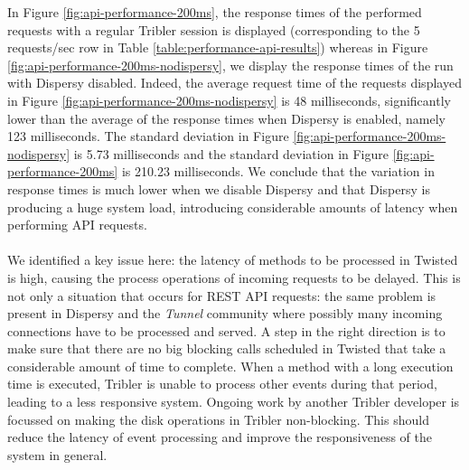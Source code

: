\noindent In Figure \ref{fig:api-performance-200ms}, the response times of the performed requests with a regular Tribler session is displayed (corresponding to the 5 requests/sec row in Table \ref{table:performance-api-results}) whereas in Figure \ref{fig:api-performance-200ms-nodispersy}, we display the response times of the run with Dispersy disabled. Indeed, the average request time of the requests displayed in Figure \ref{fig:api-performance-200ms-nodispersy} is 48 milliseconds, significantly lower than the average of the response times when Dispersy is enabled, namely 123 milliseconds. The standard deviation in Figure \ref{fig:api-performance-200ms-nodispersy} is 5.73 milliseconds and the standard deviation in Figure \ref{fig:api-performance-200ms} is 210.23 milliseconds. We conclude that the variation in response times is much lower when we disable Dispersy and that Dispersy is producing a huge system load, introducing considerable amounts of latency when performing API requests.\\\\
We identified a key issue here: the latency of methods to be processed in Twisted is high, causing the process operations of incoming requests to be delayed. This is not only a situation that occurs for REST API requests: the same problem is present in Dispersy and the \emph{Tunnel} community where possibly many incoming connections have to be processed and served. A step in the right direction is to make sure that there are no big blocking calls scheduled in Twisted that take a considerable amount of time to complete. When a method with a long execution time is executed, Tribler is unable to process other events during that period, leading to a less responsive system. Ongoing work by another Tribler developer is focussed on making the disk operations in Tribler non-blocking. This should reduce the latency of event processing and improve the responsiveness of the system in general.\\\\

